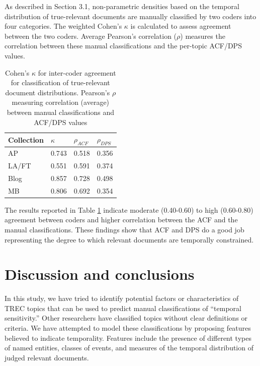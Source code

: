 \documentclass[runningheads,a4paper]{llncs}
\begin{document}
As described in Section 3.1, non-parametric densities based on the temporal distribution of true-relevant documents are manually classified by two coders into four categories.  The weighted Cohen's $\kappa$ is calculated to assess agreement between the two coders.  Average Pearson's correlation ($\rho$) measures the correlation between these manual classifications and the per-topic ACF/DPS values.  

\begin{table}
\centering
\begin{tabular}{| l | l | l | l | } \hline
\bf{Collection} & \bf{$\kappa$}  & \bf{$\rho_{ACF}$} & \bf{$\rho_{DPS}$} \\ \hline
AP 	   & 0.743 & 0.518 & 0.356 \\ \hline
LA/FT & 0.551 & 0.591 & 0.374 \\ \hline
Blog    & 0.857 & 0.728 & 0.498 \\ \hline
MB      & 0.806 & 0.692 & 0.354 \\ \hline 
\end{tabular}
\caption{Cohen's $\kappa$ for inter-coder agreement for classification of true-relevant document distributions. Pearson's $\rho$ measuring correlation (average) between manual classifications and ACF/DPS values}
\label{table.cor}
\end{table}

The results reported in Table \ref{table.cor} indicate moderate (0.40-0.60) to high (0.60-0.80) agreement between coders and higher correlation between the ACF and the manual classifications. These findings show that ACF and DPS do a good job representing the degree to which relevant documents are temporally constrained. 



\section{Discussion and conclusions}

In this study, we have tried to identify potential factors or characteristics of TREC topics that can be used to predict manual classifications of ``temporal sensitivity.'' Other researchers have classified topics without clear definitions or criteria. We have attempted to model these classifications by proposing features believed to indicate temporality.  Features include the presence of different types of named entities, classes of events, and measures of the temporal distribution of judged relevant documents.
\end{document}
